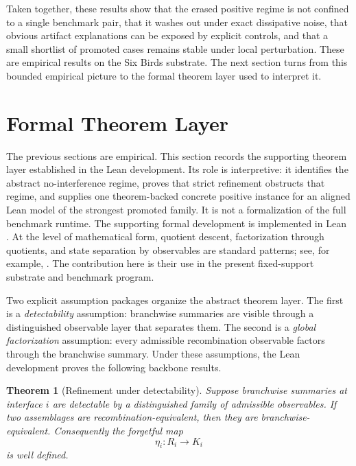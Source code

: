 \documentclass[11pt]{article}
\newtheorem{theorem}{Theorem}[section]
\theoremstyle{definition}
\begin{document}
Taken together, these results show that the erased positive regime is not confined to a single benchmark pair, that it washes out under exact dissipative noise, that obvious artifact explanations can be exposed by explicit controls, and that a small shortlist of promoted cases remains stable under local perturbation. These are empirical results on the Six Birds substrate. The next section turns from this bounded empirical picture to the formal theorem layer used to interpret it.

\section{Formal Theorem Layer}

The previous sections are empirical. This section records the supporting theorem layer established in the Lean development. Its role is interpretive: it identifies the abstract no-interference regime, proves that strict refinement obstructs that regime, and supplies one theorem-backed concrete positive instance for an aligned Lean model of the strongest promoted family. It is not a formalization of the full benchmark runtime. The supporting formal development is implemented in Lean \cite{deMouraEtAl2015Lean}. At the level of mathematical form, quotient descent, factorization through quotients, and state separation by observables are standard patterns; see, for example, \cite{MacLane1998Categories,Jacobson1985BasicAlgebraI,BuschGrabowskiLahti1995OperationalQuantumPhysics}. The contribution here is their use in the present fixed-support substrate and benchmark program.

Two explicit assumption packages organize the abstract theorem layer. The first is a \emph{detectability} assumption: branchwise summaries are visible through a distinguished observable layer that separates them. The second is a \emph{global factorization} assumption: every admissible recombination observable factors through the branchwise summary. Under these assumptions, the Lean development proves the following backbone results.

\begin{theorem}[Refinement under detectability]
Suppose branchwise summaries at interface \(i\) are detectable by a distinguished family of admissible observables. If two assemblages are recombination-equivalent, then they are branchwise-equivalent. Consequently the forgetful map
\[
\eta_i : R_i \to K_i
\]
is well defined.
\end{theorem}
\end{document}
